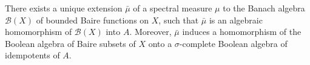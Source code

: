 There exists a unique extension $\bar{\mu}$ of a spectral measure $\mu$ to the Banach algebra $\mathcal{B}(X)$ of bounded Baire functions on $X$, such that $\bar{\mu}$ is an algebraic homomorphism of $\mathcal{B}(X)$ into $A$. Moreover, $\bar{\mu}$ induces a homomorphism of the Boolean algebra of Baire subsets of $X$ onto a $\sigma$-complete Boolean algebra of idempotents of $A$.
